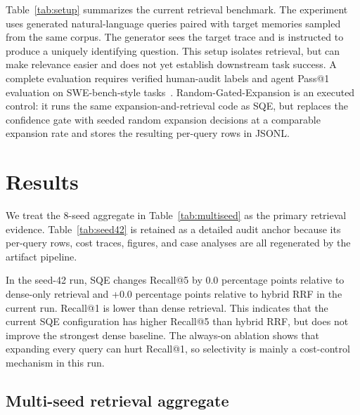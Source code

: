 \documentclass[10pt]{article}
\begin{document}
Table~\ref{tab:setup} summarizes the current retrieval benchmark. The
experiment uses generated natural-language queries paired with target memories
sampled from the same corpus. The generator sees the target trace and is
instructed to produce a uniquely identifying question. This setup isolates
retrieval, but can make relevance easier and does not yet establish
downstream task success. A complete evaluation requires verified human-audit
labels and agent Pass@1 evaluation on SWE-bench-style tasks~\cite{jimenez2024swebench}.
Random-Gated-Expansion is an executed control: it runs the same
expansion-and-retrieval code as SQE, but replaces the confidence gate with seeded
random expansion decisions at a comparable expansion rate and stores the
resulting per-query rows in JSONL.

\section{Results}
We treat the 8-seed aggregate in Table~\ref{tab:multiseed} as the primary
retrieval evidence. Table~\ref{tab:seed42} is retained as a detailed audit
anchor because its per-query rows, cost traces, figures, and case analyses are
all regenerated by the artifact pipeline.

\begin{table}[!tbp]
\caption{Seed-42 retrieval results used as the detailed audit anchor.}
\label{tab:seed42}
\centering
\small

\end{table}

In the seed-42 run, SQE changes Recall@5 by 0.0 percentage points relative to dense-only
retrieval and +0.0 percentage points relative to hybrid RRF
in the current run. Recall@1 is lower than dense retrieval. This indicates that
the current SQE configuration has higher Recall@5 than hybrid RRF,
but does not improve the strongest dense baseline. The always-on ablation shows
that expanding every query can hurt Recall@1, so selectivity is mainly a
cost-control mechanism in this run.

\subsection{Multi-seed retrieval aggregate}
\begin{table}[!tbp]
\caption{Aggregate retrieval results over independent memory-index seeds.}
\label{tab:multiseed}
\centering
\small

\end{table}
\end{document}
